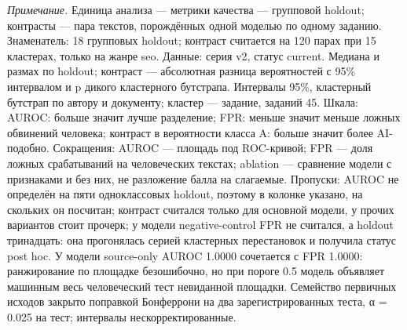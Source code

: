 \begin{table}[htbp]
\begin{minipage}{\linewidth}
\textit{Примечание.} Единица анализа — метрики качества — групповой holdout; контрасты — пара текстов, порождённых одной моделью по одному заданию. Знаменатель: 18 групповых holdout; контраст считается на 120 парах при 15 кластерах, только на жанре seo. Данные: серия v2, статус current. Медиана и размах по holdout; контраст — абсолютная разница вероятностей с 95\% интервалом и p дикого кластерного бутстрапа. Интервалы 95\%, кластерный бутстрап по автору и документу; кластер — задание, заданий 45. Шкала: AUROC: больше значит лучше разделение; FPR: меньше значит меньше ложных обвинений человека; контраст в вероятности класса A: больше значит более AI-подобно. Сокращения: AUROC — площадь под ROC-кривой; FPR — доля ложных срабатываний на человеческих текстах; ablation — сравнение модели с признаками и без них, не разложение балла на слагаемые. Пропуски: AUROC не определён на пяти одноклассовых holdout, поэтому в колонке указано, на скольких он посчитан; контраст считался только для основной модели, у прочих вариантов стоит прочерк; у модели negative-control FPR не считался, а holdout тринадцать: она прогонялась серией кластерных перестановок и получила статус post hoc. У модели source-only AUROC 1.0000 сочетается с FPR 1.0000: ранжирование по площадке безошибочно, но при пороге 0.5 модель объявляет машинным весь человеческий тест невиданной площадки. Семейство первичных исходов закрыто поправкой Бонферрони на два зарегистрированных теста, α = 0.025 на тест; интервалы нескорректированные.
\end{minipage}
\end{table}
